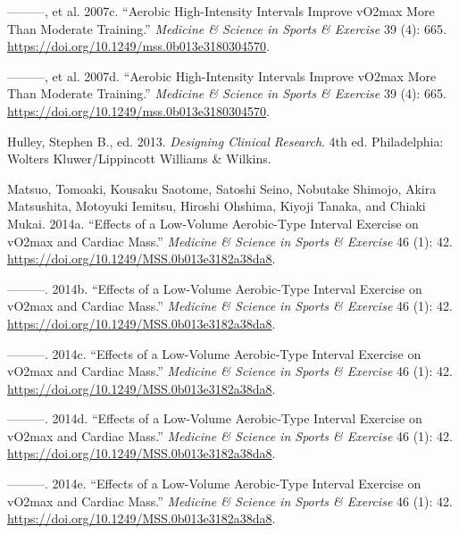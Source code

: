 \documentclass[
  letterpaper,
  DIV=11,
  numbers=noendperiod]{scrartcl}
\newlength{\cslhangindent}
\newlength{\cslentryspacingunit} %
\newenvironment{CSLReferences}[2] %
 {%
  \setlength{\parindent}{0pt}
  \ifodd #1
  \let\oldpar\par
  \def\par{\hangindent=\cslhangindent\oldpar}
  \fi
  \setlength{\parskip}{#2\cslentryspacingunit}
 }%
 {}
\begin{document}
\begin{CSLReferences}{1}{0}
\leavevmode{}%
---------, et al. 2007c. {``Aerobic High-Intensity Intervals Improve
v{\textperiodcentered}O2max More Than Moderate Training.''}
\emph{Medicine \& Science in Sports \& Exercise} 39 (4): 665.
\url{https://doi.org/10.1249/mss.0b013e3180304570}.

\leavevmode{}%
---------, et al. 2007d. {``Aerobic High-Intensity Intervals Improve
v{\textperiodcentered}O2max More Than Moderate Training.''}
\emph{Medicine \& Science in Sports \& Exercise} 39 (4): 665.
\url{https://doi.org/10.1249/mss.0b013e3180304570}.

\leavevmode{}%
Hulley, Stephen B., ed. 2013. \emph{Designing Clinical Research}. 4th
ed. Philadelphia: Wolters Kluwer/Lippincott Williams \& Wilkins.

\leavevmode{}%
Matsuo, Tomoaki, Kousaku Saotome, Satoshi Seino, Nobutake Shimojo, Akira
Matsushita, Motoyuki Iemitsu, Hiroshi Ohshima, Kiyoji Tanaka, and Chiaki
Mukai. 2014a. {``Effects of a Low-Volume Aerobic-Type Interval Exercise
on v{\textperiodcentered}O2max and Cardiac Mass.''} \emph{Medicine \&
Science in Sports \& Exercise} 46 (1): 42.
\url{https://doi.org/10.1249/MSS.0b013e3182a38da8}.

\leavevmode{}%
---------. 2014b. {``Effects of a Low-Volume Aerobic-Type Interval
Exercise on v{\textperiodcentered}O2max and Cardiac Mass.''}
\emph{Medicine \& Science in Sports \& Exercise} 46 (1): 42.
\url{https://doi.org/10.1249/MSS.0b013e3182a38da8}.

\leavevmode{}%
---------. 2014c. {``Effects of a Low-Volume Aerobic-Type Interval
Exercise on v{\textperiodcentered}O2max and Cardiac Mass.''}
\emph{Medicine \& Science in Sports \& Exercise} 46 (1): 42.
\url{https://doi.org/10.1249/MSS.0b013e3182a38da8}.

\leavevmode{}%
---------. 2014d. {``Effects of a Low-Volume Aerobic-Type Interval
Exercise on v{\textperiodcentered}O2max and Cardiac Mass.''}
\emph{Medicine \& Science in Sports \& Exercise} 46 (1): 42.
\url{https://doi.org/10.1249/MSS.0b013e3182a38da8}.

\leavevmode{}%
---------. 2014e. {``Effects of a Low-Volume Aerobic-Type Interval
Exercise on v{\textperiodcentered}O2max and Cardiac Mass.''}
\emph{Medicine \& Science in Sports \& Exercise} 46 (1): 42.
\url{https://doi.org/10.1249/MSS.0b013e3182a38da8}.


\end{CSLReferences}
\end{document}
